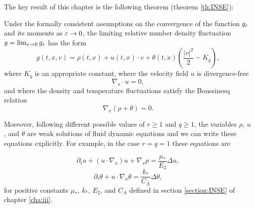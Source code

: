 The key result of this chapter is the following theorem (theorem \ref{th:INSE}):
\begin{theorem*}
	Under the formally consistent assumptions on the convergence of the function $g_{\varepsilon}$ and its moments as ${\varepsilon}\to 0$, the limiting relative number density fluctuation $g=\lim _{{\varepsilon}\to 0} g_{\varepsilon}$ has the form
	\[g(t,x,v)=\rho(t,x)+ u(t,x)\cdot v +\theta(t,x)  \left(\frac{|v|^2}{2}-K_g \right),\]
	where $K_g$ is an appropriate constant, where the velocity field $u$ is divergence-free
	\[\nabla_x\cdot u=0,\]
	and where the density and temperature fluctuations satisfy the Boussinesq relation
	\[\nabla_x(\rho+\theta)=0.\]

Moreover, following different possible values of $r\ge 1$ and $q\ge 1$, the variables $\rho$, $u$, and $\theta$ are weak solutions of fluid dynamic equations and we can write these equations explicitly. For example, in the case $r=q=1$ these equations are

\begin{equation*} \partial_t u+   (u\cdot \nabla_x) u  
 +\nabla_x p
=\frac{\mu_*}{E_2}\Delta u,  \end{equation*}
\begin{equation*} 
\partial_t \theta +  u\cdot \nabla_x\theta= \frac{k_*}{C_A}\Delta\theta,
\end{equation*}
for positive constants $\mu_*$, $k_*$, $E_2$, and $C_A$ defined in section \ref{section:INSE} of chapter \ref{cha:iii}.
\end{theorem*}



